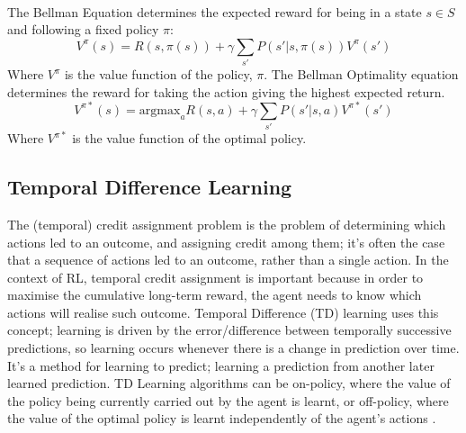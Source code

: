 \\The Bellman Equation determines the expected reward for being in a state $s \in S$ and following a fixed policy $\pi$:
$$V^\pi(s) = R(s, \pi(s)) + \gamma \sum_{s'}P(s'|s,\pi(s))V^\pi(s')$$
Where $V^\pi$ is the value function of the policy, $\pi$.
The Bellman Optimality equation determines the reward for taking the action giving the highest expected return.
$$V^{\pi*}(s) = \text{argmax}_a{R(s,a) + \gamma\sum_{s'}P(s'|s,a)V^{\pi*}(s')}$$
Where $V^{\pi*}$ is the value function of the optimal policy.
\subsection{Temporal Difference Learning}
The (temporal) credit assignment problem \cite{Minsky:1961:ire} is the problem of determining which actions led to an outcome, and assigning credit among them; it's often the case that a sequence of actions led to an outcome, rather than a single action. In the context of RL, temporal credit assignment is important because in order to maximise the cumulative long-term reward, the agent needs to know which actions will realise such outcome. Temporal Difference (TD) \cite{10.5555/911176, 5392560} learning uses this concept; learning is driven by the error/difference between temporally successive predictions, so learning occurs whenever there is a change in prediction over time. It's a method for learning to predict; learning a prediction from another later learned prediction.
TD Learning algorithms can be on-policy, where the value of the policy being currently carried out by the agent is learnt, or off-policy, where the value of the optimal policy is learnt independently of the agent's actions \cite{PooleMackworth17}.
